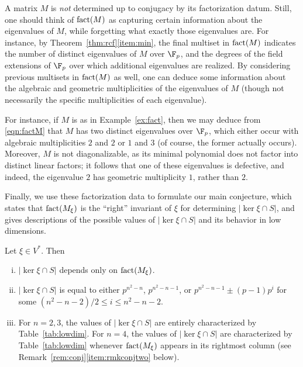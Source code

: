 \begin{rem}
A matrix $M$ is \emph{not} determined up to conjugacy by its factorization datum. Still, one should think of $\operatorname{fact}(M)$ as capturing certain information about the eigenvalues of $M$, while forgetting what exactly those eigenvalues are. For instance, by Theorem~\ref{thm:rcf}\eqref{item:min}, the final multiset in $\operatorname{fact}(M)$ indicates the number of distinct eigenvalues of $M$ over $\F_p$, and the degrees of the field extensions of $\F_p$ over which additional eigenvalues are realized. By considering previous multisets in $\operatorname{fact}(M)$ as well, one can deduce some information about the algebraic and geometric multiplicities of the eigenvalues of $M$ (though not necessarily the specific multiplicities of each eigenvalue).

For instance, if $M$ is as in Example~\ref{ex:fact}, then we may deduce from \eqref{eqn:factM} that $M$ has two distinct eigenvalues over $\F_p$, which either occur with algebraic multiplicities $2$ and $2$ or $1$ and $3$ (of course, the former actually occurs). Moreover, $M$ is not diagonalizable, as its minimal polynomial does not factor into distinct linear factors; it follows that one of these eigenvalues is defective, and indeed, the eigenvalue $2$ has geometric multiplicity $1$, rather than $2$.
\end{rem}

Finally, we use these factorization data to formulate our main conjecture, which states that $\operatorname{fact}(M_\xi)$ is the ``right'' invariant of $\xi$ for determining $|\ker\xi\cap S|$, and gives descriptions of the possible values of $|\ker\xi\cap S|$ and its behavior in low dimensions.

\begin{conj}
\label{conj:main}
Let $\xi\in V^*$. Then
\begin{enumerate}[(i)]
\item $|\ker\xi\cap S|$ depends only on $\operatorname{fact}(M_\xi)$.
\item $|\ker\xi\cap S|$ is equal to either $p^{n^2-n}$, $p^{n^2-n-1}$, or $p^{n^2-n-1}\pm(p-1)p^i$ for some $(n^2-n-2)/2\le i\le n^2-n-2$.
\label{item:conjvals}
\item For $n=2,3$, the values of $|\ker\xi\cap S|$ are entirely characterized by Table~\ref{tab:lowdim}. For $n=4$, the values of $|\ker\xi\cap S|$ are characterized by Table~\ref{tab:lowdim} whenever $\operatorname{fact}(M_\xi)$ appears in its rightmost column (see Remark~\ref{rem:conj}\eqref{item:rmkconjtwo} below).\label{item:conjlown}
\end{enumerate}
\end{conj}


